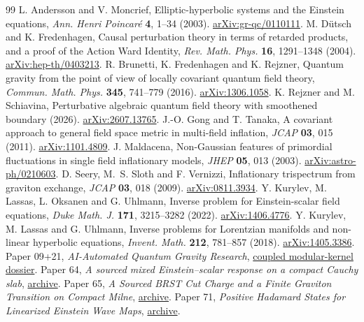 \documentclass[11pt]{article}
\numberwithin{equation}{section}
\begin{document}
\begin{thebibliography}{99}
 L. Andersson and V. Moncrief,
Elliptic-hyperbolic systems and the Einstein equations,
\emph{Ann. Henri Poincar\'e} \textbf{4}, 1--34 (2003).
\href{https://arxiv.org/abs/gr-qc/0110111}{arXiv:gr-qc/0110111}.
 M. D\"utsch and K. Fredenhagen,
Causal perturbation theory in terms of retarded products, and a proof of the Action Ward Identity,
\emph{Rev. Math. Phys.} \textbf{16}, 1291--1348 (2004).
\href{https://arxiv.org/abs/hep-th/0403213}{arXiv:hep-th/0403213}.
 R. Brunetti, K. Fredenhagen and K. Rejzner,
Quantum gravity from the point of view of locally covariant quantum field theory,
\emph{Commun. Math. Phys.} \textbf{345}, 741--779 (2016).
\href{https://arxiv.org/abs/1306.1058}{arXiv:1306.1058}.
 K. Rejzner and M. Schiavina,
Perturbative algebraic quantum field theory with smoothened boundary (2026).
\href{https://arxiv.org/abs/2607.13765}{arXiv:2607.13765}.
 J.-O. Gong and T. Tanaka,
A covariant approach to general field space metric in multi-field inflation,
\emph{JCAP} \textbf{03}, 015 (2011).
\href{https://arxiv.org/abs/1101.4809}{arXiv:1101.4809}.
 J. Maldacena,
Non-Gaussian features of primordial fluctuations in single field inflationary models,
\emph{JHEP} \textbf{05}, 013 (2003).
\href{https://arxiv.org/abs/astro-ph/0210603}{arXiv:astro-ph/0210603}.
 D. Seery, M.~S. Sloth and F. Vernizzi,
Inflationary trispectrum from graviton exchange,
\emph{JCAP} \textbf{03}, 018 (2009).
\href{https://arxiv.org/abs/0811.3934}{arXiv:0811.3934}.
 Y. Kurylev, M. Lassas, L. Oksanen and G. Uhlmann,
Inverse problem for Einstein-scalar field equations,
\emph{Duke Math. J.} \textbf{171}, 3215--3282 (2022).
\href{https://arxiv.org/abs/1406.4776}{arXiv:1406.4776}.
 Y. Kurylev, M. Lassas and G. Uhlmann,
Inverse problems for Lorentzian manifolds and non-linear hyperbolic equations,
\emph{Invent. Math.} \textbf{212}, 781--857 (2018).
\href{https://arxiv.org/abs/1405.3386}{arXiv:1405.3386}.
 Paper 09+21, \emph{AI-Automated Quantum Gravity Research},
\href{https://github.com/g3173028019-beep/ai-automated-quantum-gravity-research/tree/main/papers/09-21-coupled-modular-kernel}{coupled modular-kernel dossier}.
 Paper 64, \emph{A sourced mixed Einstein--scalar response on a compact Cauchy slab},
\href{https://github.com/g3173028019-beep/ai-automated-quantum-gravity-research/tree/main/papers/64-active-einstein-scalar-mixed-response}{archive}.
 Paper 65, \emph{A Sourced BRST Cut Charge and a Finite Graviton Transition on Compact Milne},
\href{https://github.com/g3173028019-beep/ai-automated-quantum-gravity-research/tree/main/papers/65-sourced-brst-cut-graviton-transition}{archive}.
 Paper 71, \emph{Positive Hadamard States for Linearized Einstein Wave Maps},
\href{https://github.com/g3173028019-beep/ai-automated-quantum-gravity-research/tree/main/papers/71-hadamard-states-einstein-wave-maps}{archive}.
\end{thebibliography}
\end{document}
